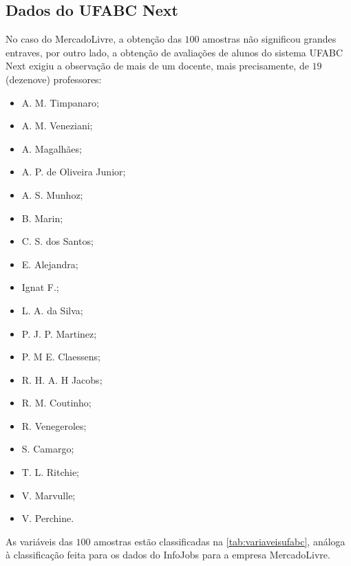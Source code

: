     \subsection{Dados do UFABC Next}
    
    No caso do MercadoLivre, a obtenção das $100$ amostras não significou grandes entraves, por outro lado, a obtenção de avaliações de alunos do sistema UFABC Next exigiu a observação de mais de um docente, mais precisamente, de $19$ (dezenove) professores:
    
    \begin{itemize}
        \item A. M. Timpanaro;
        \item A. M. Veneziani;
        \item A. Magalhães;
        \item A. P. de Oliveira Junior;
        \item A. S. Munhoz;
        \item B. Marin;
        \item C. S. dos Santos;
        \item E. Alejandra;
        \item Ignat F.;
        \item L. A. da Silva;
        \item P. J. P. Martinez;
        \item P. M E. Claessens;
        \item R. H. A. H Jacobs;
        \item R. M. Coutinho;
        \item R. Venegeroles;
        \item S. Camargo;
        \item T. L. Ritchie;
        \item V. Marvulle;
        \item V. Perchine.
    \end{itemize}
	
	As variáveis das $100$ amostras estão classificadas na \autoref{tab:variaveisufabc}, análoga à classificação feita para os dados do InfoJobs para a empresa MercadoLivre.
	
